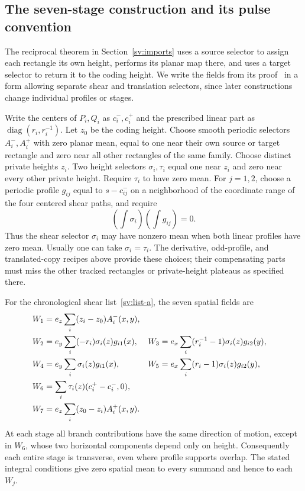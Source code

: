 \subsection{The seven-stage construction and its pulse convention}
\label{sv:reciprocal-template}
The reciprocal theorem in Section~\ref{sv:imports} uses a source
selector to assign each rectangle its own height, performs its planar
map there, and uses a target selector to return it to the coding height.
We write the fields from its proof~\cite[Theorem~3.2]{Entry} in a form
allowing separate shear and translation selectors, since later
constructions change individual profiles or stages.

Write the centers of $P_i,Q_i$ as $c_i^-,c_i^+$ and the prescribed
linear part as $\operatorname{diag}(r_i,r_i^{-1})$.  Let $z_0$ be
the coding height.  Choose smooth periodic selectors $A_i^-,A_i^+$
with zero planar mean, equal to one near their own source or target
rectangle and zero near all other rectangles of the same family.
Choose distinct private heights $z_i$.  Two height selectors
$\sigma_i,\tau_i$ equal one near $z_i$ and zero near every other
private height.  Require $\tau_i$ to have zero mean.  For $j=1,2$,
choose a periodic profile $g_{ij}$ equal to $s-c_{ij}^-$ on a
neighborhood of the coordinate range of the four centered shear paths,
and require
\[
 \left(\int\sigma_i\right)\left(\int g_{ij}\right)=0.
\]
Thus the shear selector $\sigma_i$ may have nonzero mean when both
linear profiles have zero mean.  Usually one can take
$\sigma_i=\tau_i$.  The derivative, odd-profile, and translated-copy
recipes above provide these choices; their compensating parts must
miss the other tracked rectangles or private-height plateaus as
specified there.

For the chronological shear list~\eqref{sv:list-a}, the seven spatial
fields are
\begin{align}
 W_1&=e_z\sum_i(z_i-z_0)A_i^-(x,y),\notag\\
 W_2&=e_y\sum_i(-r_i)\sigma_i(z)g_{i1}(x),&
 W_3&=e_x\sum_i(r_i^{-1}-1)\sigma_i(z)g_{i2}(y),\notag\\
 W_4&=e_y\sum_i\sigma_i(z)g_{i1}(x),&
 W_5&=e_x\sum_i(r_i-1)\sigma_i(z)g_{i2}(y),\notag\\
 W_6&=\sum_i\tau_i(z)(c_i^+-c_i^-,0),\notag\\
 W_7&=e_z\sum_i(z_0-z_i)A_i^+(x,y).
 \label{sv:seven-fields}
\end{align}
At each stage all branch contributions have the same direction of
motion, except in $W_6$, whose two horizontal components depend only
on height.  Consequently each entire stage is transverse, even where
profile supports overlap.  The stated integral conditions give zero
spatial mean to every summand and hence to each $W_j$.

